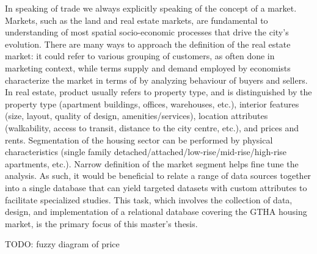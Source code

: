 In speaking of trade we always explicitly speaking of the concept of a market.
Markets, such as the land and real estate markets, are fundamental to understanding of most spatial socio-economic processes that drive the city's evolution.
There are many ways to approach the definition of the real estate market\cite{Brett2009}: it could refer to various grouping of customers, as often done in marketing context, while terms supply and demand employed by economists characterize the market in terms of by analyzing behaviour of buyers and sellers.
In real estate, product usually refers to property type, and is distinguished by the property type (apartment buildings, offices, warehouses, etc.), interior features (size, layout, quality of design, amenities/services), location attributes (walkability, access to transit, distance to the city centre, etc.), and prices and rents.
Segmentation of the housing sector can be performed by physical characteristics (single family detached/attached/low-rise/mid-rise/high-rise apartments, etc.).
Narrow definition of the market segment helps fine tune the analysis.
As such, it would be beneficial to relate a range of data sources together into a single database that can yield targeted datasets with custom attributes to facilitate specialized studies.
This task, which involves the collection of data, design, and implementation of a relational database covering the GTHA housing market, is the primary focus of this master's thesis.

TODO: fuzzy diagram of price


